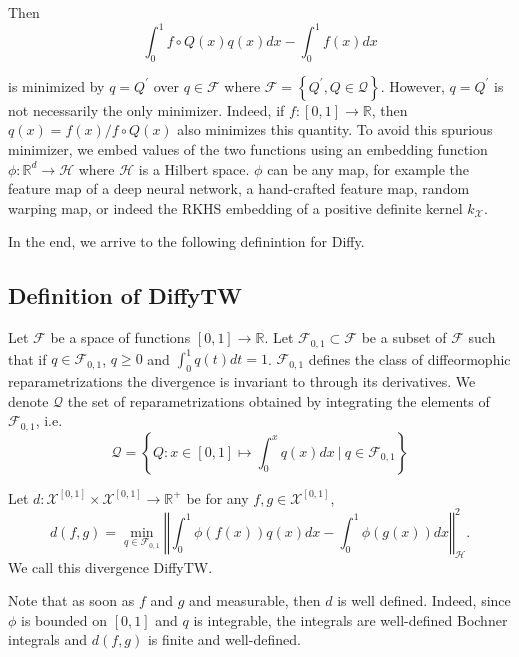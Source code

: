 Then
\begin{equation}
\int_0^1 f\circ Q(x)q(x) dx - \int_0^1 f(x)dx
\end{equation}

is minimized by $q=Q^\prime$ over $q\in \mathcal F$ where $\mathcal F = \left\lbrace Q^\prime, Q\in\mathcal Q\right\rbrace$. However, $q=Q^\prime$ is not necessarily the only minimizer. Indeed, if $f:[0,1] \to \mathbb R$, then $q(x) = f(x) / f\circ Q(x)$ also minimizes this quantity. To avoid this spurious minimizer, we embed values of the two functions using an embedding function $\phi:\mathbb R^d \to \mathcal H$ where $\mathcal H$ is a Hilbert space. $\phi$ can be any map, for example the feature map of a deep neural network, a hand-crafted feature map, random warping map, or indeed the RKHS embedding of a positive definite kernel $k_\mathcal X$.

In the end, we arrive to the following definintion for Diffy.

\subsection{Definition of DiffyTW}

Let $\mathcal F$ be a space of functions $[0, 1] \to \mathbb R$. Let $\mathcal F_{0,1} \subset \mathcal F$ be a subset of $\mathcal F$ such that if $q\in\mathcal F_{0,1}$, $q\geq 0$ and $\int_0^1q(t)dt =1$. $\mathcal F_{0,1}$ defines the class of diffeormophic reparametrizations the divergence is invariant to through its derivatives. We denote $\mathcal Q$ the set of reparametrizations obtained by integrating the elements of $\mathcal F_{0,1}$, i.e.
\begin{equation}
    \mathcal Q = \left\lbrace Q: x\in[0,1] \mapsto \int_0^x q(x)dx ~\vert~ q \in \mathcal F_{0,1}\right\rbrace
\end{equation}

\begin{definition}[DiffyTW]\label{def:diffytw}
Let $d: \mathcal X^{[0,1]} \times \mathcal X^{[0,1]} \to \mathbb R^+$ be for any $f, g\in\mathcal X^{[0,1]}$,
\begin{equation}\label{eq:diffytw}
    d(f, g) = \min_{q \in \mathcal F_{0,1}}\left\Vert \int_0^1 \phi(f(x))q(x)dx - \int_0^1\phi(g(x))dx\right\Vert^2_\mathcal H.
\end{equation}
We call this divergence DiffyTW.
\end{definition}

Note that as soon as $f$ and $g$ and measurable, then $d$ is well defined. Indeed, since $\phi$ is bounded on $[0,1]$ and $q$ is integrable, the integrals are well-defined Bochner integrals and $d(f, g)$ is finite and well-defined.

